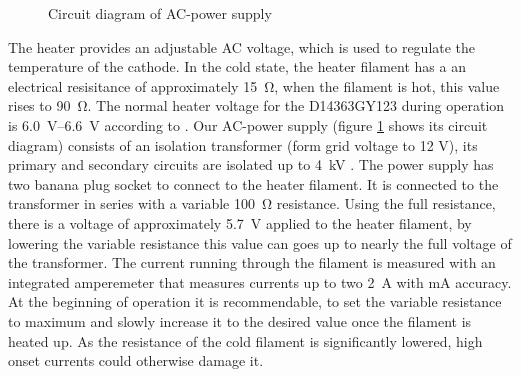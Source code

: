 
\begin{figure}
	\centering
	\caption{Circuit diagram of AC-power supply }
	\label{fig:heater_circuit}
\end{figure}

The heater provides an adjustable AC voltage, which is used to regulate the temperature of the cathode. In the cold state, the heater filament has a an electrical resisitance of approximately \SI{15}{\ohm}, when the filament is hot, this value rises to \SI{90}{\ohm}. The normal heater voltage for the D14363GY123 during  operation is \SIrange{6.0}{6.6}{\volt} according to \cite{D14363GY123-manual}. 
Our AC-power supply (figure \ref{fig:heater_circuit} shows its circuit diagram) consists of an isolation transformer (form grid voltage to 12 V), its primary  and secondary circuits are isolated up to \SI{4}{\kilo\volt} \cite{Myrra}. The power supply has two  banana plug socket to connect to the heater filament. 
It is connected to the transformer in series with a variable \SI{100}{\ohm} resistance. Using the full resistance, there is a voltage of approximately \SI{5.7}{\volt} applied to the heater filament, by lowering the variable resistance this value can goes up to nearly the full voltage of the transformer. 
The current running through the filament is measured with an integrated amperemeter \cite{Solutions} that measures currents up to two \SI{2}{\ampere} with \si{\milli\ampere} accuracy.
At the beginning of operation it is recommendable, to set the variable resistance to maximum and slowly increase it to the desired value once the filament is heated up. As the resistance of the cold filament is significantly lowered, high onset currents could otherwise damage it.  

